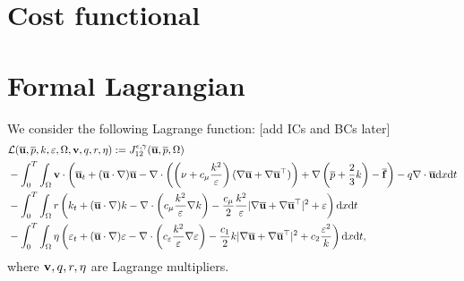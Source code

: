 \documentclass[oneside,11pt]{book}
\numberwithin{equation}{section}
\begin{document}
\section{Cost functional}

\section{Formal Lagrangian}
We consider the following Lagrange function: [add ICs and BCs later]
\begin{align*}
    &\mathcal{L}(\overline{\bf u},\overline{p},k,\varepsilon,\Omega,{\bf v},q,r,\eta) := J_{12}^{\epsilon,\gamma}(\overline{\bf u},\overline{p},\Omega)\\
    &- \int_0^T\int_\Omega {\bf v}\cdot\left(\overline{\bf u}_t + (\overline{\bf u}\cdot\nabla)\overline{\bf u} - \nabla\cdot\left(\left(\nu + c_\mu\frac{k^2}{\varepsilon}\right)(\nabla \overline{\bf u} + \nabla \overline{\bf u}^\top)\right) + \nabla\left(\overline{p} + \frac{2}{3}k\right) - \overline{\bf f}\right) - q\nabla\cdot \overline{\bf u}{\rm d}x{\rm d}t\\
    &- \int_0^T\int_\Omega r\left(k_t + (\overline{\bf u}\cdot\nabla)k - \nabla\cdot\left(c_\mu\frac{k^2}{\varepsilon}\nabla k\right) - \frac{c_\mu}{2}\frac{k^2}{\varepsilon}|\nabla \overline{\bf u} + \nabla \overline{\bf u}^\top|^2 + \varepsilon\right){\rm d}x{\rm d}t\\
    &- \int_0^T\int_\Omega \eta\left(\varepsilon_t + (\overline{\bf u}\cdot\nabla)\varepsilon - \nabla\cdot\left(c_\varepsilon\frac{k^2}{\varepsilon}\nabla\varepsilon\right) - \frac{c_1}{2}k|\nabla \overline{\bf u} + \nabla \overline{\bf u}^\top|^2 + c_2\frac{\varepsilon^2}{k}\right){\rm d}x{\rm d}t,
\end{align*}
where ${\bf v},q,r,\eta$ are Lagrange multipliers.
\end{document}
